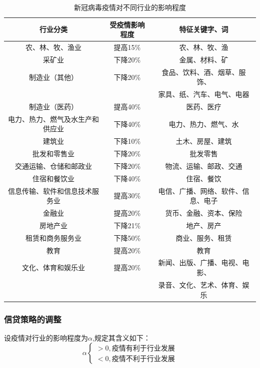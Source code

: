 \documentclass{my_paper}
\begin{document}
\begin{table}[htb]
\centering
\caption{新冠病毒疫情对不同行业的影响程度}
\begin{tabular}{c|c|c}
    \toprule
    行业分类             & 受疫情影响程度 & 特征关键字、词                       \\
    \midrule
    农、林、牧、渔业         & 提高15\%  & 农、林、牧、渔                       \\
    采矿业              & 下降20\%  & 金属、材料、矿                       \\
    制造业（其他）          & 下降20\%  & 食品、饮料、酒、烟草、服饰、   \\
    &&家具、纸、汽车、电气、电器\\
    制造业（医药）          & 提高40\%  & 医药、医疗                         \\
    电力、热力、燃气及水生产和供应业 & 下降40\%  & 电力、热力、燃气、水                    \\
    建筑业              & 下降10\%  & 土木、房屋、建筑                      \\
    批发和零售业           & 下降20\%  & 批发零售                          \\
    交通运输、仓储和邮政业      & 下降20\%  & 物流、运输、邮政、交通                   \\
    住宿和餐饮业           & 下降40\%  & 住宿、餐饮                         \\
    信息传输、软件和信息技术服务业  & 提高30\%  & 电信、广播、网络、软件、信息、电子             \\
    金融业              & 提高20\%  & 货币、金融、资本、保险                   \\
    房地产业             & 下降21\%  & 地产、房产                         \\
    租赁和商务服务业         & 下降50\%  & 商业、服务、租赁                      \\
    教育               & 提高20\%  & 教育                            \\
    文化、体育和娱乐业        & 提高20\%  & 新闻、出版、广播、电视、电影、\\&&录音、文化、艺术、体育、娱乐\\
    \bottomrule
  \end{tabular}
\label{label}
  \end{table}

  \newpage
  \subsubsection{信贷策略的调整}
  设疫情对行业的影响程度为$\alpha$,规定其含义如下：
  $$\alpha\begin{cases}
    >0,\text{疫情有利于行业发展}\\
    <0,\text{疫情不利于行业发展}
  \end{cases}$$
\end{document}
